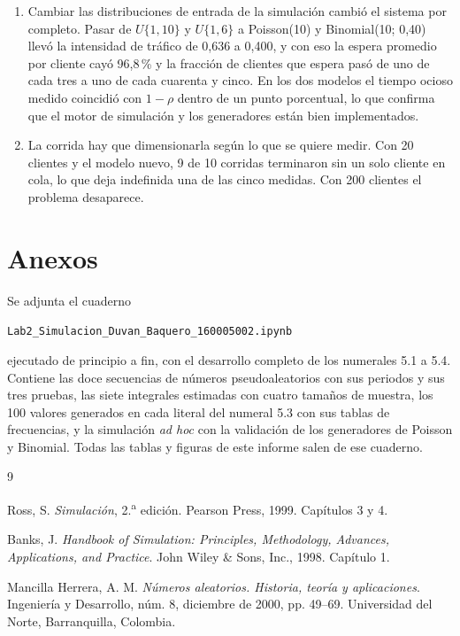 \documentclass[11pt,letterpaper]{article}
\newcommand{\codigoEstudiante}{160005002}
\begin{document}
\begin{enumerate}[itemsep=4pt]
\item Cambiar las distribuciones de entrada de la simulación cambió el sistema por completo. Pasar de
$U\{1,10\}$ y $U\{1,6\}$ a Poisson(10) y Binomial(10; 0,40) llevó la intensidad de tráfico de 0,636 a
0,400, y con eso la espera promedio por cliente cayó 96,8\,\% y la fracción de clientes que espera
pasó de uno de cada tres a uno de cada cuarenta y cinco. En los dos modelos el tiempo ocioso medido
coincidió con $1-\rho$ dentro de un punto porcentual, lo que confirma que el motor de simulación y los
generadores están bien implementados.

\item La corrida hay que dimensionarla según lo que se quiere medir. Con 20 clientes y el modelo
nuevo, 9 de 10 corridas terminaron sin un solo cliente en cola, lo que deja indefinida una de las
cinco medidas. Con 200 clientes el problema desaparece.

\end{enumerate}

\section{Anexos}

Se adjunta el cuaderno

\begin{center}
\texttt{Lab2\_Simulacion\_Duvan\_Baquero\_\codigoEstudiante.ipynb}
\end{center}

\noindent ejecutado de principio a fin, con el desarrollo completo de los numerales 5.1 a 5.4. Contiene las doce secuencias de números pseudoaleatorios con sus periodos y sus
tres pruebas, las siete integrales estimadas con cuatro tamaños de muestra, los 100 valores generados
en cada literal del numeral 5.3 con sus tablas de frecuencias, y la simulación \emph{ad hoc} con la
validación de los generadores de Poisson y Binomial. Todas las tablas y figuras de este informe salen
de ese cuaderno.

\begin{thebibliography}{9}

Ross, S. \emph{Simulación}, 2.\textsuperscript{a} edición. Pearson Press, 1999. Capítulos 3 y 4.

Banks, J. \emph{Handbook of Simulation: Principles, Methodology, Advances, Applications, and
Practice}. John Wiley \& Sons, Inc., 1998. Capítulo 1.

Mancilla Herrera, A. M. \emph{Números aleatorios. Historia, teoría y aplicaciones}. Ingeniería y
Desarrollo, núm. 8, diciembre de 2000, pp. 49--69. Universidad del Norte, Barranquilla, Colombia.

\end{thebibliography}
\end{document}
